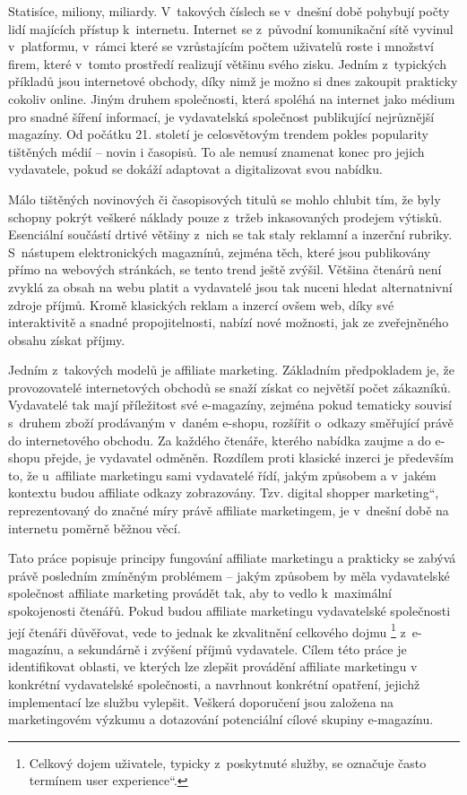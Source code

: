 \documentclass[12pt,twoside,openany]{fithesis}
\begin{document}
Statisíce, miliony, miliardy. V~takových číslech se v~dnešní době 
pohybují počty lidí majících přístup k~internetu. Internet se 
z~původní komunikační sítě vyvinul v~platformu, v~rámci které se 
vzrůstajícím počtem uživatelů roste i množství firem, které v~tomto 
prostředí realizují většinu svého zisku. Jedním z~typických příkladů 
jsou internetové obchody, díky nimž je možno si dnes zakoupit prakticky 
cokoliv online. Jiným druhem společnosti, která spoléhá na internet jako 
médium pro snadné šíření informací, je vydavatelská společnost 
publikující nejrůznější magazíny. Od počátku 21. století je 
celosvětovým trendem pokles popularity tištěných médií -- novin i 
časopisů. To ale nemusí znamenat konec pro jejich vydavatele, pokud se 
dokáží adaptovat a digitalizovat svou nabídku. \cite{decline-of-print}

Málo tištěných novinových či časopisových titulů se mohlo chlubit 
tím, že byly schopny pokrýt veškeré náklady pouze z~tržeb inkasovaných 
prodejem výtisků. Esenciální součástí drtivé většiny z~nich se tak 
staly reklamní a inzerční rubriky. S~nástupem elektronických magaznínů, 
zejména těch, které jsou publikovány přímo na webových stránkách, se 
tento trend ještě zvýšil. Většina čtenárů není zvyklá za obsah na 
webu platit a vydavatelé jsou tak nuceni hledat alternatnivní zdroje 
příjmů. Kromě klasických reklam a inzercí ovšem web, díky své 
interaktivitě a snadné propojitelnosti, nabízí nové možnosti, jak ze 
zveřejněného obsahu získat příjmy.

Jedním z~takových modelů je affiliate marketing. Základním předpokladem 
je, že provozovatelé internetových obchodů se snaží získat co 
největší počet zákazníků. Vydavatelé tak mají příležitost své 
e-magazíny, zejména pokud tematicky souvisí s~druhem zboží prodávaným 
v~daném e-shopu, rozšířit o~odkazy směřující právě do internetového 
obchodu. Za každého čtenáře, kterého nabídka zaujme a do e-shopu 
přejde, je vydavatel odměněn. Rozdílem proti klasické inzerci je 
především to, že u~affiliate marketingu sami vydavatelé řídí, jakým 
způsobem a v~jakém kontextu budou affiliate odkazy zobrazovány. Tzv. \glqq 
digital shopper marketing\textquotedblleft{}, reprezentovaný do značné míry 
právě affiliate marketingem, je v~dnešní době na internetu poměrně 
běžnou věcí. \cite{marketingova-komunikace}

Tato práce popisuje principy fungování affiliate marketingu a prakticky se 
zabývá právě posledním zmíněným problémem -- jakým způsobem by měla 
vydavatelské společnost affiliate marketing provádět tak, aby to vedlo 
k~maximální spokojenosti čtenářů. Pokud budou affiliate marketingu 
vydavatelské společnosti její čtenáři důvěřovat, vede to jednak ke 
zkvalitnění celkového dojmu
\footnote{Celkový dojem uživatele, typicky z~poskytnuté služby, se označuje 
často termínem \glqq user experience\textquotedblleft{}.} 
z~e-magazínu, a sekundárně i zvýšení příjmů vydavatele. Cílem této práce 
je identifikovat oblasti, ve kterých lze zlepšit provádění
affiliate marketingu v konkrétní vydavatelské společnosti, a navrhnout
konkrétní opatření, jejichž implementací lze službu vylepšit. Veškerá
doporučení jsou založena na marketingovém výzkumu a dotazování potenciální
cílové skupiny e-magazínu.
\end{document}
